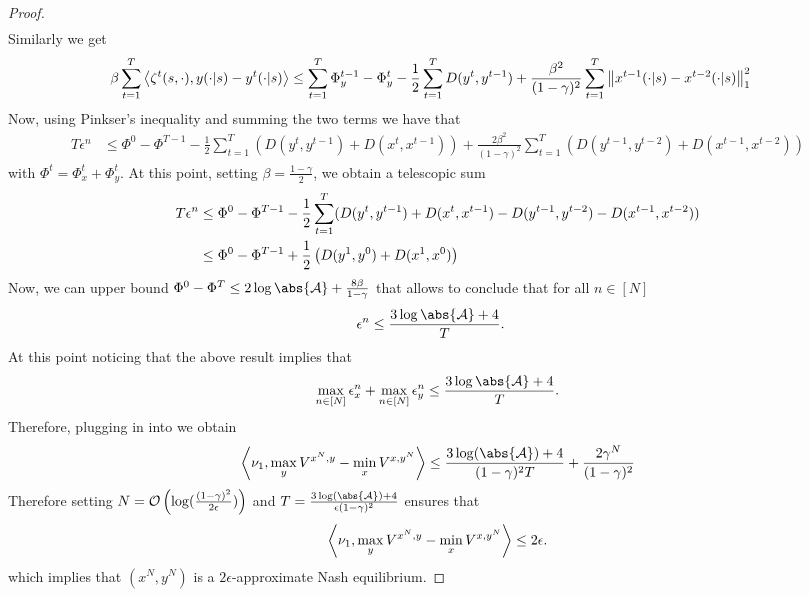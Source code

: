 \begin{proof}
\begin{align*}
\end{align*}
Similarly we get
\begin{align*}
 \beta \sum^T_{t=1}\left\langle{ \zeta^{t}(s, \cdot)},{y(\cdot|s) - y^{t}(\cdot|s)}\right\rangle
&\leq \sum^T_{t=1} \Phi_y^{t-1} - \Phi_y^t - \frac{1}{2} \sum^T_{t=1} D(y^t, y^{t-1}) +  \frac{ \beta^2}{(1 - \gamma)^2} \sum^T_{t=1} \left\lVert x^{t-1}(\cdot|s) - x^{t-2}(\cdot|s)\right\rVert^2_1 
\end{align*}
Now, using Pinkser's inequality and summing the two terms we have that
\begin{align*}
    T \epsilon^n &\leq \Phi^0 - \Phi^{T-1} - \frac{1}{2}\sum^T_{t=1} (D(y^t, y^{t-1}) + D(x^t, x^{t-1})) + \frac{2  \beta^2}{(1 - \gamma)^2} \sum^T_{t=1} (D(y^{t-1}, y^{t-2}) + D(x^{t-1}, x^{t-2}))
\end{align*}
with $\Phi^t = \Phi^t_x + \Phi^t_y$. At this point, setting $ \beta = \frac{1 - \gamma}{2}$, we obtain a telescopic sum
\begin{align*}
    T \epsilon^n &\leq \Phi^0 - \Phi^{T-1} - \frac{1}{2}\sum^T_{t=1} (D(y^t, y^{t-1}) + D(x^t, x^{t-1}) - D(y^{t-1}, y^{t-2}) - D(x^{t-1}, x^{t-2})) \\
    &\leq \Phi^0 - \Phi^{T-1} + \frac{1}{2}\left({D(y^1, y^0) + D(x^1,x^0)}\right)
\end{align*}
Now, we can upper bound $\Phi^0 - \Phi^T \leq 2 \log \abs{\mathcal{A}} + \frac{8  \beta}{1 - \gamma}$ that allows to conclude that for all $n \in [N]$
\begin{align*}
    \epsilon^n &\leq \frac{3 \log \abs{\mathcal{A}} + 4}{T}.
\end{align*}
At this point noticing that the above result implies that $$\max_{n \in [N]} \epsilon^n_x + \max_{n\in[N]} \epsilon^n_y \leq \frac{3 \log \abs{\mathcal{A}} + 4}{T}.$$
Therefore, plugging in into \cite[Theorem 1]{perolat2015approximate} we obtain
\begin{equation*}
    \innerprod{\initial}{\max_{y} V^{x^N,y} - \min_x V^{x,y^N}} \leq \frac{3 \log(\abs{\mathcal{A}})+4}{(1 - \gamma)^2 T}  + \frac{2 \gamma^N}{(1 - \gamma)^2}
\end{equation*}
Therefore setting $N = \mathcal{O}\left({\log (\frac{(1 - \gamma)^2}{2 \epsilon})}\right)$ and $T = \frac{3 \log(\abs{\mathcal{A}})+4}{\epsilon (1 - \gamma)^2}$ ensures that
\begin{equation*}
    \left\langle{\nu_1},{\max_{y} V^{x^N,y} - \min_x V^{x,y^N}}\right\rangle \leq 2 \epsilon.
\end{equation*}
which implies that $(x^N,y^N)$ is a $2 \epsilon$-approximate Nash equilibrium.
\fi
\end{proof}

